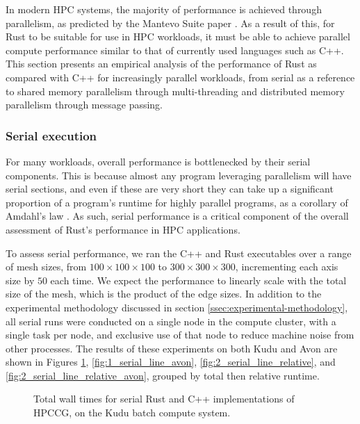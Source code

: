 In modern \acrshort{HPC} systems, the majority of performance is achieved through parallelism, as predicted by the Mantevo Suite paper \cite{heroux2013mantevo}. As a result of this, for Rust to be suitable for use in \acrshort{HPC} workloads, it must be able to achieve parallel compute performance similar to that of currently used languages such as C++. This section presents an empirical analysis of the performance of Rust as compared with C++ for increasingly parallel workloads, from serial as a reference to shared memory parallelism through multi-threading and distributed memory parallelism through message passing.

\subsubsection{Serial execution}
\label{sssec:serial-execution}

For many workloads, overall performance is bottlenecked by their serial components. This is because almost any program leveraging parallelism will have serial sections, and even if these are very short they can take up a significant proportion of a program's runtime for highly parallel programs, as a corollary of Amdahl's law \cite{amdahlsLaw}. As such, serial performance is a critical component of the overall assessment of Rust's performance in \acrshort{HPC} applications.

To assess serial performance, we ran the C++ and Rust executables over a range of mesh sizes, from $100 \times 100 \times 100$ to $300 \times 300 \times 300$, incrementing each axis size by $50$ each time. We expect the performance to linearly scale with the total size of the mesh, which is the product of the edge sizes. In addition to the experimental methodology discussed in section \ref{ssec:experimental-methodology}, all serial runs were conducted on a single node in the compute cluster, with a single task per node, and exclusive use of that node to reduce machine noise from other processes. The results of these experiments on both Kudu and Avon are shown in Figures \ref{fig:1_serial_line}, \ref{fig:1_serial_line_avon}, \ref{fig:2_serial_line_relative}, and \ref{fig:2_serial_line_relative_avon}, grouped by total then relative runtime.

\begin{figure}[H]
    \centering
    \fbox{}
    \captionsetup{skip=0pt}
    \caption{Total wall times for serial Rust and C++ implementations of \acrshort{HPCCG}, on the Kudu batch compute system.}
    \label{fig:1_serial_line}
\end{figure}

